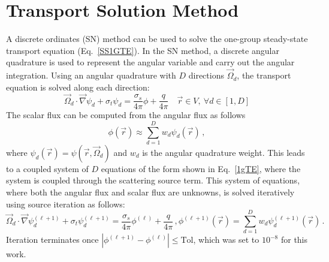 \documentclass[12pt]{report}
\newcommand{\vr}{\vec{r}}
\newcommand{\vO}{\vec{\Omega}}
\newcommand{\grad}{\vec{\nabla}}
\newcommand{\sigt}{\sigma_t}
\newcommand{\sigs}{\sigma_s}
\newcommand{\angSource}{\frac{q}{4 \pi}}
\begin{document}
\section{Transport Solution Method}
A discrete ordinates (SN) method can be used to solve the one-group steady-state transport 
equation (Eq.~\eqref{SS1GTE}). In the SN method, a discrete angular quadrature is used to represent
the angular variable and carry out the angular integration.
Using an angular quadrature with $D$ directions $\vO_d$, the transport 
equation is solved along each direction:
\begin{equation}
\label{1gSNTE}
\vO_d \cdot \grad \psi_d + \sigt \psi_d = \frac{\sigs}{4 \pi} \phi + \angSource \quad \vr \in V ,\  \forall d\in [1,D]
\end{equation}
%
The scalar flux can be computed from the angular flux as follows
\[
\phi(\vr) \approx \sum_{d=1}^D w_d \psi_d(\vr) \,,
\] 
where $\psi_d(\vr) = \psi(\vr, \vO_d)$ and $w_d$ is the angular quadrature weight. This leads to a coupled system of $D$ equations of the form shown in Eq.~\eqref{1gTE}, where the system is coupled through the scattering source term. This system of equations, where both 
the angular flux and scalar flux are unknowns, is solved iteratively using source iteration as follows:
\begin{subequations}
\begin{equation}
\label{1gTE}
\vO_d \cdot \grad \psi_d^{(\ell+1)} + \sigt \psi_d^{(\ell+1)} = \frac{\sigs}{4 \pi} \phi^{(\ell)} + \angSource \,,
\end{equation}
\begin{equation}
\phi^{(\ell+1)}(\vr) = \sum_{d=1}^D w_d \psi_d^{(\ell+1)}(\vr) \,.
\end{equation}
\end{subequations}
Iteration terminates once $\left|\phi^{(\ell+1)} - \phi^{(\ell)} \right| \leq \text{Tol}$, which was set to $10^{-8}$ for this work.
\end{document}
